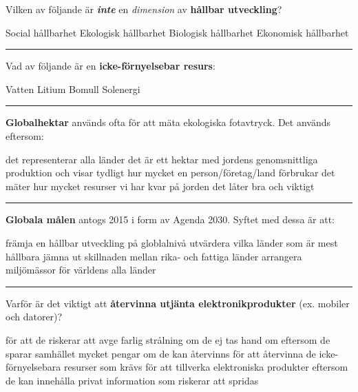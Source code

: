 \documentclass{exam}
\begin{document}
\vspace{5mm} %
\begin{center}
\end{center}
\vspace{5mm} %

\begin{questions}
\printanswers
\question Vilken av följande är \textbf{\textit{inte}} en \textit{dimension} av \textbf{hållbar utveckling}?
\begin{checkboxes}
   \choice Social hållbarhet
   \choice Ekologisk hållbarhet
   \correctchoice Biologisk hållbarhet
   \choice Ekonomisk hållbarhet
\end{checkboxes} 

\vspace{5mm} 
\hrule 
\vspace{5mm} 
\question Vad av följande är en \textbf{icke-förnyelsebar resurs}:
\begin{checkboxes}
   \choice Vatten
   \correctchoice Litium
   \choice Bomull
   \choice Solenergi
\end{checkboxes}

\vspace{5mm} 
\hrule 
\vspace{5mm} 
\question \textbf{Globalhektar} används ofta för att mäta ekologiska fotavtryck. Det används eftersom:
\begin{checkboxes}
   \choice det representerar alla länder
   \correctchoice det är ett hektar med jordens genomsnittliga produktion och visar tydligt hur mycket en person/företag/land förbrukar
   \choice det mäter hur mycket resurser vi har kvar på jorden
   \choice det låter bra och viktigt
\end{checkboxes}

\vspace{5mm} 
\hrule 
\vspace{5mm} 
\question \textbf{Globala målen} antogs 2015 i form av Agenda 2030. Syftet med dessa är att:
\begin{checkboxes}
   \correctchoice främja en hållbar utveckling på globlalnivå
   \choice utvärdera vilka länder som är mest hållbara
   \choice jämna ut skillnaden mellan rika- och fattiga länder
   \choice arrangera miljömässor för världens alla länder
\end{checkboxes}

\vspace{5mm} 
\hrule 
\vspace{5mm} 
\question Varför är det viktigt att \textbf{återvinna utjänta elektronikprodukter} (ex. mobiler och datorer)? 
\begin{checkboxes}
   \choice för att de riskerar att avge farlig strålning om de ej tas hand om
   \choice eftersom de sparar samhället mycket pengar om de kan återvinns
   \correctchoice för att återvinna de icke-förnyelsebara resurser som krävs för att tillverka elektroniska produkter
   \choice eftersom de kan innehålla privat information som riskerar att spridas
\end{checkboxes}
\break



\end{questions}
\end{document}
